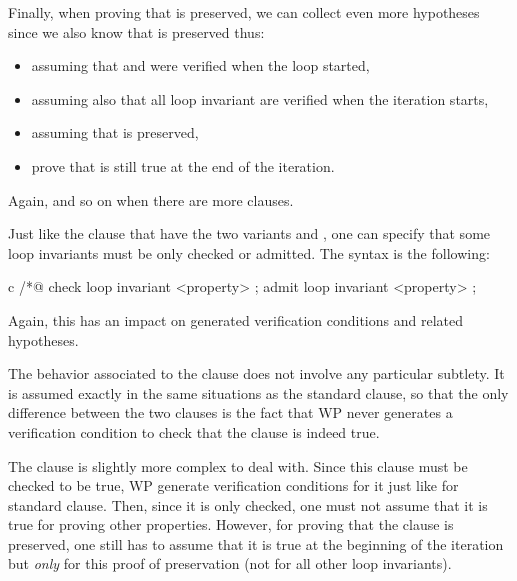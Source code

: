 

Finally, when proving that  is preserved, we can collect even
more hypotheses since we also know that  is preserved thus:
\begin{itemize}
  \item assuming that  and  were verified when the
        loop started,
  \item assuming also that all loop invariant are verified when the iteration
        starts,
  \item assuming that  is preserved,
  \item prove that  is still true at the end of the iteration.
\end{itemize}
Again, and so on when there are more  clauses.




\label{l3:statements-loops-inv-kinds}


Just like the  clause that have the two variants
 and , one can specify that some
loop invariants must be only checked or admitted. The syntax is the following:


\begin{CodeBlock}{c}
/*@ check loop invariant <property> ;
    admit loop invariant <property> ;
\end{CodeBlock}


Again, this has an impact on generated verification conditions and related
hypotheses.


The behavior associated to the  clause does not
involve any particular subtlety. It is assumed exactly in the same situations as
the standard  clause, so that the only difference
between the two clauses is the fact that WP never generates a verification
condition to check that the  clause is indeed
true.


The  clause is slightly more complex to deal
with. Since this clause must be checked to be true, WP generate verification
conditions for it just like for standard  clause.
Then, since it is only checked, one must not assume that it is true for proving
other properties. However, for proving that the 
clause is preserved, one still has to assume that it is true at the beginning of
the iteration but \textit{only} for this proof of preservation (not for all other
loop invariants).


